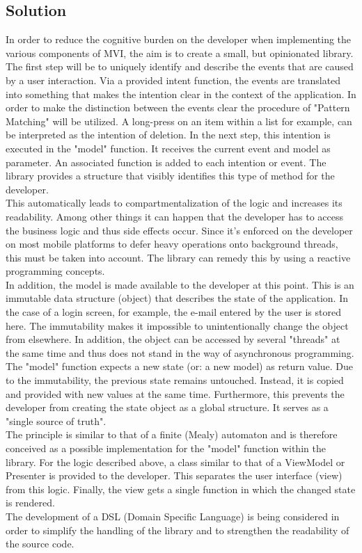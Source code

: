\subsection{Solution}
\label{subsec:solution}

In order to reduce the cognitive burden on the developer when implementing the various components of MVI, the aim 
is to create a small, but opinionated library.
\\
The first step will be to uniquely identify and describe the events that are caused by a user interaction.
Via a provided intent function, the events are translated into something that makes the intention clear in the context of the application.
In order to make the distinction between the events clear the procedure of "Pattern Matching" will be utilized. A long-press on an item within a list for example, 
can be interpreted as the intention of deletion. In the next step, this intention is executed in the "model" function. It receives the current event and model 
as parameter. An associated function is added to each intention or event. The library provides a structure that visibly identifies this type of method for the developer.
\\
This automatically leads to compartmentalization of the logic and increases its readability. Among other things it can happen that the developer has to access the business 
logic and thus side effects occur. Since it's enforced on the developer on most mobile platforms to defer heavy operations onto background threads, this must be taken
into account. The library can remedy this by using a reactive programming concepts.
\\
In addition, the model is made available to the developer
at this point. This is an immutable data structure (object) that describes the state of the application. In the case of a login screen, for example, the e-mail 
entered by the user is stored here. The immutability makes it impossible to unintentionally change the object from elsewhere. In addition, the object can be accessed 
by several "threads" at the same time and thus does not stand in the way of asynchronous programming. The "model" function expects a new state (or: a new model) 
as return value. Due to the immutability, the previous state remains untouched. Instead, it is copied and provided with new values at the same time. Furthermore, 
this prevents the developer from creating the state object as a global structure. It serves as a "single source of truth".
\\
The principle is similar to that of a finite (Mealy) automaton and is therefore conceived as a possible implementation for the "model" function within the library. For the logic described above, a class similar to that of a ViewModel or Presenter 
is provided to the developer. This separates the user interface (view) from this logic. Finally, the view gets a single function in which the changed state is rendered.
\\
The development of a DSL (Domain Specific Language) is being considered in order to simplify the handling of the library and to strengthen the readability 
of the source code.


